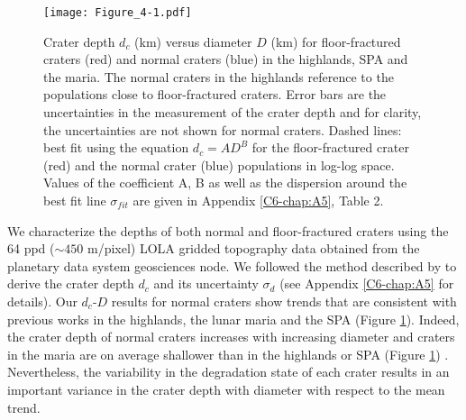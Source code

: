 \begin{figure}[h!]
  \graphicspath{ {/Users/thorey/Documents/These/Projet/FFC/Gravi_GRAIL/Article/Papier/Proof/} }
  \begin{center}

    \texttt{[image: Figure\_4-1.pdf]}

    \caption{Crater  depth $d_c$  (km)  versus diameter  $D$ (km)  for
      floor-fractured craters  (red) and normal craters  (blue) in the
      highlands,  SPA  and  the  maria.  The  normal  craters  in  the
      highlands reference to the  populations close to floor-fractured
      craters.  Error bars are the uncertainties in the measurement of
      the  crater depth  and for  clarity, the  uncertainties are  not
      shown  for normal  craters.  Dashed  lines: best  fit using  the
      equation $d_c =  AD^B$ for the floor-fractured  crater (red) and
      the normal  crater (blue) populations in  log-log space.  Values
      of the  coefficient A, B  as well  as the dispersion  around the
      best   fit   line   $\sigma_{fit}$   are   given   in   Appendix
      \ref{C6-chap:A5}, Table 2.}
    \label{C6-Figure4-1}
  \end{center}
\end{figure}


We characterize the depths of  both normal and floor-fractured craters
using  the 64  ppd ($\sim450$  m/pixel) LOLA  gridded topography  data
\citep{Zuber:2009bq}   obtained  from   the   planetary  data   system
geosciences   node.     We   followed   the   method    described   by
\citet{Kalynn:2013fg}  to  derive  the  crater  depth  $d_c$  and  its
uncertainty  $\sigma_{d}$ (see  Appendix  \ref{C6-chap:A5} for  details).
Our  $d_c$-$D$  results  for  normal  craters  show  trends  that  are
consistent with previous  works in the highlands, the  lunar maria and
the SPA (Figure \ref{C6-Figure4-1}).  Indeed,  the crater depth of normal
craters increases  with increasing diameter  and craters in  the maria
are  on  average  shallower  than  in the  highlands  or  SPA  (Figure
\ref{C6-Figure4-1})        \citep{Pike:1974ux,Pike:1980eh,Kalynn:2013fg}.
Nevertheless, the variability in the  degradation state of each crater
results in  an important  variance in the  crater depth  with diameter
with respect to the mean trend.

